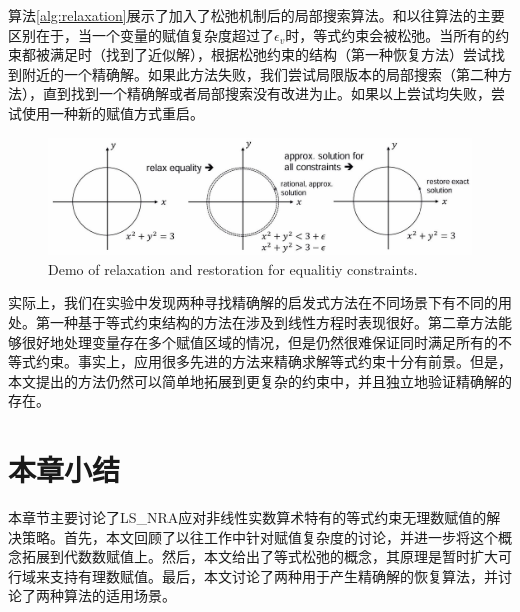 算法\ref{alg:relaxation}展示了加入了松弛机制后的局部搜索算法。和以往算法的主要区别在于，当一个变量的赋值复杂度超过了$\epsilon_v$时，等式约束会被松弛。当所有的约束都被满足时（找到了近似解），根据松弛约束的结构（第一种恢复方法）尝试找到附近的一个精确解。如果此方法失败，我们尝试局限版本的局部搜索（第二种方法），直到找到一个精确解或者局部搜索没有改进为止。如果以上尝试均失败，尝试使用一种新的赋值方式重启。

\begin{figure}[t]
    \centering
    \includegraphics[width=\columnwidth]{Img/relax.jpg}
     {Demo of relaxation and restoration for equalitiy constraints.}
\label{fig:relaxation}
\end{figure}

实际上，我们在实验中发现两种寻找精确解的启发式方法在不同场景下有不同的用处。第一种基于等式约束结构的方法在涉及到线性方程时表现很好。第二章方法能够很好地处理变量存在多个赋值区域的情况，但是仍然很难保证同时满足所有的不等式约束。事实上，应用很多先进的方法来精确求解等式约束十分有前景\cite{CimattiGLS22, LiXZ23b}。但是，本文提出的方法仍然可以简单地拓展到更复杂的约束中，并且独立地验证精确解的存在。

\section{本章小结}
本章节主要讨论了LS\_NRA应对非线性实数算术特有的等式约束无理数赋值的解决策略。首先，本文回顾了以往工作中针对赋值复杂度的讨论，并进一步将这个概念拓展到代数数赋值上。然后，本文给出了等式松弛的概念，其原理是暂时扩大可行域来支持有理数赋值。最后，本文讨论了两种用于产生精确解的恢复算法，并讨论了两种算法的适用场景。

